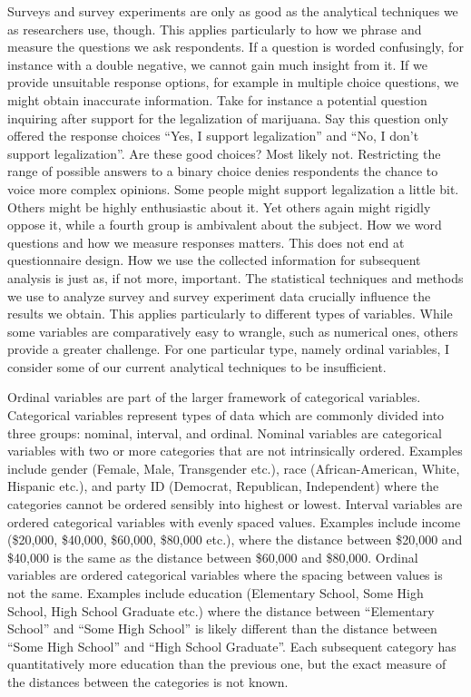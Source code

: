 \documentclass[12pt,econ]{sources/authesis}
\begin{document}
Surveys and survey experiments are only as good as the analytical techniques we as researchers use, though. This applies particularly to how we phrase and measure the questions we ask respondents. If a question is worded confusingly, for instance with a double negative, we cannot gain much insight from it. If we provide unsuitable response options, for example in multiple choice questions, we might obtain inaccurate information. Take for instance a potential question inquiring after support for the legalization of marijuana. Say this question only offered the response choices ``Yes, I support legalization'' and ``No, I don't support legalization''. Are these good choices? Most likely not. Restricting the range of possible answers to a binary choice denies respondents the chance to voice more complex opinions. Some people might support legalization a little bit. Others might be highly enthusiastic about it. Yet others again might rigidly oppose it, while a fourth group is ambivalent about the subject. How we word questions and how we measure responses matters. This does not end at questionnaire design. How we use the collected information for subsequent analysis is just as, if not more, important. The statistical techniques and methods we use to analyze survey and survey experiment data crucially influence the results we obtain. This applies particularly to different types of variables. While some variables are comparatively easy to wrangle, such as numerical ones, others provide a greater challenge. For one particular type, namely ordinal variables, I consider some of our current analytical techniques to be insufficient.

Ordinal variables are part of the larger framework of categorical variables. Categorical variables represent types of data which are commonly divided into three groups: nominal, interval, and ordinal. Nominal variables are categorical variables with two or more categories that are not intrinsically ordered. Examples include gender (Female, Male, Transgender etc.), race (African-American, White, Hispanic etc.), and party ID (Democrat, Republican, Independent) where the categories cannot be ordered sensibly into highest or lowest. Interval variables are ordered categorical variables with evenly spaced values. Examples include income (\$20,000, \$40,000, \$60,000, \$80,000 etc.), where the distance between \$20,000 and \$40,000 is the same as the distance between \$60,000 and \$80,000. Ordinal variables are ordered categorical variables where the spacing between values is not the same. Examples include education (Elementary School, Some High School, High School Graduate etc.) where the distance between ``Elementary School'' and ``Some High School'' is likely different than the distance between ``Some High School'' and ``High School Graduate''. Each subsequent category has quantitatively more education than the previous one, but the exact measure of the distances between the categories is not known.
\end{document}
